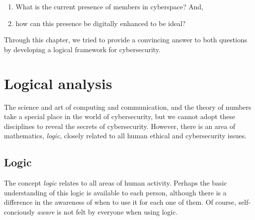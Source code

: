 \begin{enumerate}
\item What is the current presence of members in cyberspace? And,
\item how can this presence be digitally enhanced to be ideal?
\end{enumerate}

Through this chapter, we tried to provide a convincing answer to both
questions by developing a  logical framework for cybersecurity. 
\fi



\section{Logical analysis}

The science and art of computing and communication, and   the theory of numbers take a special place in the world of cybersecurity, but we cannot adopt these disciplines to reveal the secrets of cybersecurity. However, there is an area of mathematics, {\em logic}, closely related to all human ethical and cybersecurity issues.

\subsection{Logic}\label{logicsec}

The concept {\em logic} relates to all areas of human activity. Perhaps the basic understanding of this logic is available to each person, although there is a difference in the awareness of when to use it for each one of them. Of course, self-conciously {\em aware} is not felt by everyone when using logic.

